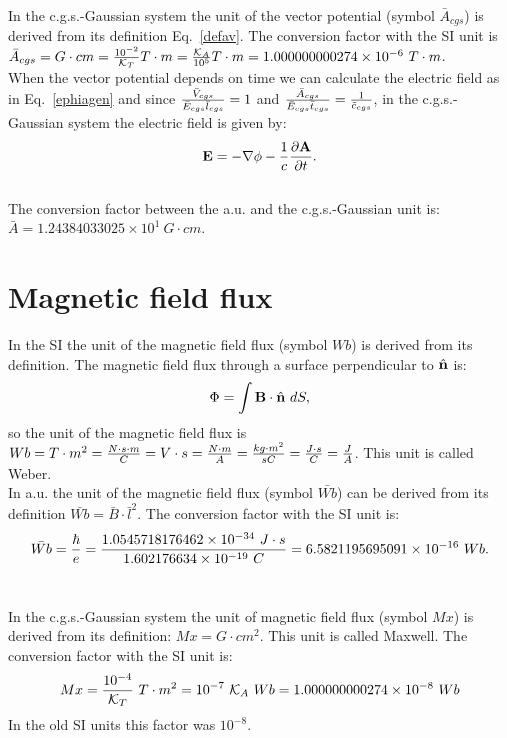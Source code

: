 \documentclass[12pt,a4paper]{article}
\def\hbarf{1.0545718176462\times 10^{-34}}
\def\e{1.602176634\times 10^{-19}}
\def\barwb{6.5821195695091\times 10^{-16}}
\def\avtoav{1.000000000274\times 10^{-6}}
\def\wbtowb{1.000000000274\times 10^{-8}}
\def\baravcgs{1.24384033025\times 10^{1}}
\begin{document}
{\color{orange} In the c.g.s.-Gaussian system the unit of the vector 
potential (symbol $\bar A_{cgs}$) is derived from its definition 
Eq.~\ref{defav}.
The conversion factor with the SI unit is 
$\bar A_{cgs} = G \cdot cm = {10^{-2}\over \mathcal{K}_T} T\cdot m=
{\mathcal{K}_A \over 10^5} T\cdot m=\avtoav\ T\cdot m$. \\

When the vector potential depends on time we can calculate the electric
field as in Eq.~\ref{ephiagen} and since 
${\bar V_{cgs} \over \bar E_{cgs} \bar l_{cgs}}=1$
and ${\bar A_{cgs} \over \bar E_{cgs} \bar t_{cgs}}={1\over 
\tilde c_{cgs}}$, in the 
c.g.s.-Gaussian system the electric field is given by:
\begin{equation}
{\bf E}=-\nabla \phi -
{1 \over c} {\partial {\bf A} \over \partial t}.
\end{equation}
}
\\

{\color{green}
The conversion factor between the a.u. and the c.g.s.-Gaussian unit is:
$\bar A = \baravcgs\ G\cdot cm$.
}

\newpage
\section{\color{coral}Magnetic field flux}
In the SI the unit of the magnetic field flux (symbol $Wb$)
is derived from its definition. The  
magnetic field flux through a surface perpendicular to 
$\hat {\bf n}$ is:
\begin{equation}
\Phi=\int {\bf B}\cdot \hat {\bf n}\ dS,
\end{equation}
so the unit of the magnetic field flux is $Wb= T \cdot m^2={N \cdot s\cdot m
\over C}=V\cdot s={N\cdot m\over A}={kg\cdot m^2 \over s C}=
{J\cdot s\over C}={J\over A}$. This
unit is called Weber.
\\

{\color{web-blue} In a.u. the unit of the magnetic field flux
(symbol $\bar {Wb}$) can be derived from its definition
$\bar {Wb}=\bar B \cdot \bar l^2$. The conversion
factor with the SI unit is:
\begin{equation}
\bar {Wb} = {\hbar \over e}=
{\hbarf\ J\cdot s\over \e\ C}=\barwb\ Wb.
\end{equation}
\\
}

{\color{orange} In the c.g.s.-Gaussian system the unit of magnetic field
flux (symbol $Mx$) is derived from its definition: $Mx=G\cdot cm^2$.
This unit is called Maxwell.
The conversion factor with the SI unit is:
\begin{equation}
Mx = {10^{-4}\over \mathcal{K}_T}\ T\cdot m^2 = 10^{-7}\ \mathcal{K}_A\ Wb =\wbtowb\ Wb
\end{equation}
In the old SI units this factor was $10^{-8}$.
}
\\
\end{document}
